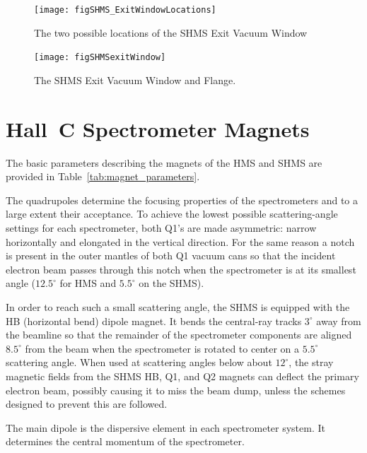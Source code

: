 \begin{figure}
\begin{center}
\texttt{[image: figSHMS\_ExitWindowLocations]}
\caption{The two possible locations of the SHMS Exit Vacuum Window \label{fig:shms_exit_window_locations}}
\end{center}
\end{figure}

\begin{figure}
\begin{center}
\texttt{[image: figSHMSexitWindow]}
\caption{The SHMS Exit Vacuum Window and Flange. \label{fig:shms_exit_window}}
\end{center}
\end{figure}

\section{Hall~C Spectrometer Magnets}

The basic parameters describing the magnets of the HMS and SHMS are provided in
Table~\ref{tab:magnet_parameters}. 

The quadrupoles determine the focusing properties of the spectrometers
and to a large extent their acceptance.
To achieve the lowest possible scattering-angle
settings for each spectrometer, both Q1's are
made asymmetric: narrow horizontally and elongated in the vertical direction. For the same
reason a notch is present in the outer mantles of both Q1 vacuum cans so
that the incident electron beam passes through this notch when the
spectrometer is at its smallest angle ($12.5^{\circ}$ for HMS and $5.5^{\circ}$ on the SHMS).

In order to reach such a small scattering angle, the SHMS is equipped with the HB
(horizontal bend) dipole magnet. It bends the central-ray tracks $3^{\circ}$ away from the
beamline so that the remainder of the spectrometer components are aligned $8.5^{\circ}$
from the beam when the spectrometer is rotated to center on a $5.5^{\circ}$ scattering angle.
When used at scattering angles below about $12^{\circ}$, the stray magnetic fields from 
the SHMS HB, Q1, and Q2 magnets can deflect the primary electron beam, possibly 
causing it to miss the beam dump, unless the schemes designed to prevent this are followed. 

The main dipole is the dispersive element in each spectrometer system. It 
determines the central momentum of the spectrometer.



